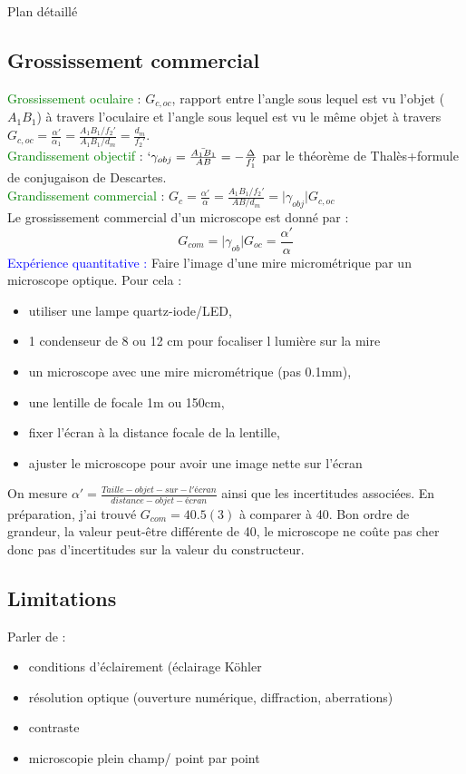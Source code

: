 \begin{reportBlock}{Plan détaillé}
  \subsection{Grossissement commercial}
  \textcolor{green}{Grossissement oculaire }: $G_{c,oc}$, rapport entre l'angle sous lequel est vu l'objet ($A_1B_1$) à travers l'oculaire et l'angle sous lequel est vu le même objet à travers $G_{c,oc}=\frac{\alpha'}{\alpha_1}=\frac{A_1B_1/f_2'}{A_1B_1/d_m}=\frac{d_m}{f_2'}$.\\
  \textcolor{green}{Grandissement objectif} : $`\gamma_{obj}=\frac{\bar{A_1B_1}}{AB}=-\frac{\Delta}{f_1'}$ par le théorème de Thalès+formule de conjugaison de Descartes.\\
  \textcolor{green}{Grandissement commercial} : $G_{c}=\frac{\alpha'}{\alpha}=\frac{A_1B_1/f_2'}{AB/d_m}=\lvert \gamma_{obj} \rvert G_{c,oc}$\\  
  Le grossissement commercial d'un microscope est donné par :
  \begin{equation}
     G_{com} = \lvert \gamma_{ob}\rvert G_{oc} = \frac{\alpha'}{\alpha}
  \end{equation}
 \textcolor{blue}{Expérience quantitative :} Faire l'image d'une mire micrométrique par un microscope optique. Pour cela : \begin{itemize}
      \item utiliser une lampe quartz-iode/LED,
      \item 1 condenseur de 8 ou 12 cm pour focaliser l lumière sur la mire
      \item un microscope avec une mire micrométrique (pas 0.1mm),
      \item une lentille de focale 1m ou 150cm,
      \item fixer l'écran à la distance focale de la lentille,
      \item ajuster le microscope pour avoir une image nette sur l'écran
  \end{itemize} 
  On mesure $\alpha'= \frac{Taille-objet-sur-l'écran}{distance-objet-écran}$ ainsi que les incertitudes associées. En préparation, j'ai trouvé $G_{com}=40.5(3)$ à comparer à 40. Bon ordre de grandeur, la valeur peut-être différente de 40, le microscope ne coûte pas cher donc pas d'incertitudes sur la valeur du constructeur.

  
  \subsection{Limitations}
  Parler de : 
  \begin{itemize}
      \item conditions d'éclairement (éclairage Köhler
      \item résolution optique (ouverture numérique, diffraction, aberrations) 
      \item contraste
      \item microscopie plein champ/ point par point
  \end{itemize}


\end{reportBlock}
